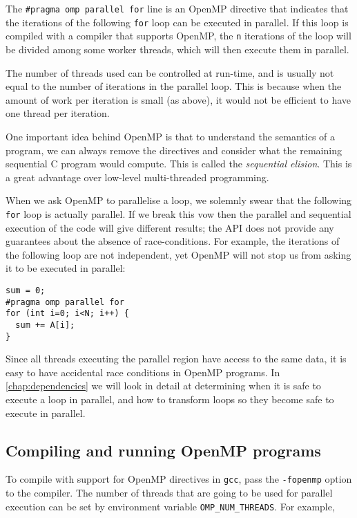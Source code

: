 The \lstinline{#pragma omp parallel for} line is an OpenMP directive
that indicates that the iterations of the following \texttt{for} loop
can be executed in parallel.  If this loop is compiled with a compiler
that supports OpenMP, the \texttt{n} iterations of the loop will be
divided among some worker threads, which will then execute them in
parallel.

The number of threads used can be controlled at run-time, and is
usually not equal to the number of iterations in the parallel loop.
This is because when the amount of work per iteration is small (as
above), it would not be efficient to have one thread per iteration.

One important idea behind OpenMP is that to understand the semantics
of a program, we can always remove the directives and consider what
the remaining sequential C program would compute.  This is called the
\emph{sequential elision}.  This is a great advantage over low-level
multi-threaded programming.

When we ask OpenMP to parallelise a loop, we solemnly swear that the
following \lstinline{for} loop is actually parallel.  If we break this
vow then the parallel and sequential execution of the code will give
different results; the API does not provide any guarantees about the
absence of race-conditions.  For example, the iterations of the
following loop are not independent, yet OpenMP will not stop us from
asking it to be executed in parallel:

\begin{lstlisting}[mathescape=true]
sum = 0;
#pragma omp parallel for
for (int i=0; i<N; i++) {
  sum += A[i];
}
\end{lstlisting}

Since all threads executing the parallel region have access to the
same data, it is easy to have accidental race conditions in OpenMP
programs.  In \cref{chap:dependencies} we will look in detail at
determining when it is safe to execute a loop in parallel, and how to
transform loops so they become safe to execute in parallel.

\subsection{Compiling and running OpenMP programs}

To compile with support for OpenMP directives in \texttt{gcc}, pass
the \texttt{-fopenmp} option to the compiler. The number of threads
that are going to be used for parallel execution can be set by
environment variable \texttt{OMP\_NUM\_THREADS}.  For example,

